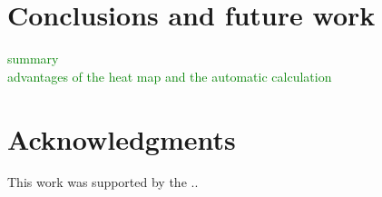 \documentclass[preprint,12pt]{elsarticle}
\begin{document}
\section{Conclusions and future work}
\label{Sec: Conclusions and future work}
\textcolor{green}{summary\\advantages of the heat map and the automatic calculation}

\section{Acknowledgments}
This work was supported by the ..








 
 




\end{document}
